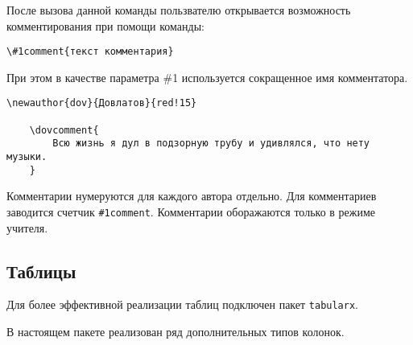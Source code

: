 После вызова данной команды пользвателю открывается возможность комментирования при помощи команды:

\begin{lstlisting}[gobble = 3]
    \#1comment{текст комментария}
\end{lstlisting}

При этом в качестве параметра \#1 используется сокращенное имя комментатора.


\begin{lstlisting}[gobble = 3]
    \newauthor{dov}{Довлатов}{red!15}

    \dovcomment{
        Всю жизнь я дул в подзорную трубу и удивлялся, что нету музыки.
    }
\end{lstlisting}

\vspace{0.2cm}


    
Комментарии нумеруются для каждого автора отдельно. Для комментариев заводится счетчик
\texttt{\#1comment}. Комментарии оборажаются только в режиме учителя.




\subsection{Таблицы}
\label{sec:tables}

Для более эффективной реализации таблиц подключен пакет \texttt{tabularx}.


В настоящем пакете реализован ряд дополнительных типов колонок.

\vspace{0.4cm}

